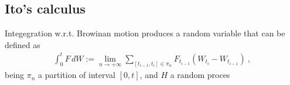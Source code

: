 \documentclass[letterpaper,10pt,english]{jupyterBook}
\begin{document}
\subsection{Ito’s calculus}
\label{\detokenize{ch/prob/processes-calculus:ito-s-calculus}}\label{\detokenize{ch/prob/processes-calculus:prob-processes-calculus-ito-calculus}}
\sphinxAtStartPar
Integegration w.r.t. Browinan motion produces a random variable that can be defined as
\begin{equation*}
\begin{split}\int_{0}^{t} F \, dW := \lim_{n \rightarrow +\infty} \sum_{[t_{i-1},t_i] \in \pi_n} F_{t_{i-1}} \left( W_{t_i} - W_{t_{i-1}} \right) \ ,\end{split}
\end{equation*}
\sphinxAtStartPar
being \(\pi_n\) a partition of interval \([0,t]\), and \(H\) a random proces  
\label{ch/prob/processes-calculus:example-0}
\end{document}
